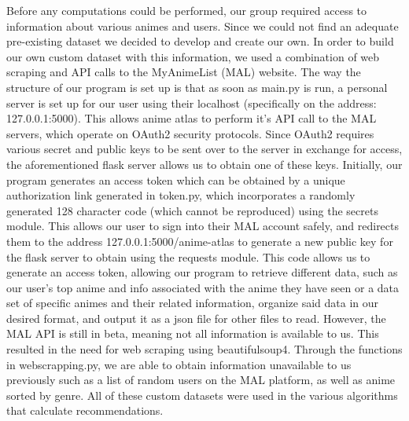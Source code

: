 \documentclass[fontsize=11pt]{article}
\begin{document}
\item[] Before any computations could be performed, our group required access to information about various animes and users. Since we could not find an adequate pre-existing dataset we decided to develop and create our own. In order to build our own custom dataset with this information, we used a combination of web scraping and API calls to the MyAnimeList (MAL) website. The way the structure of our program is set up is that as soon as main.py is run, a personal server is set up for our user using their localhost (specifically on the address: 127.0.0.1:5000). This allows anime atlas to perform it’s API call to the MAL servers, which operate on OAuth2 security protocols. Since OAuth2 requires various secret and public keys to be sent over to the server in exchange for access, the aforementioned flask server allows us to obtain one of these keys. Initially, our program generates an access token which can be obtained by a unique authorization link generated in token.py, which incorporates a randomly generated 128 character code (which cannot be reproduced) using the secrets module. This allows our user to sign into their MAL account safely, and redirects them to the address 127.0.0.1:5000/anime-atlas to generate a new public key for the flask server to obtain using the requests module. This code allows us to generate an access token, allowing our program to retrieve different data, such as our user’s top anime and info associated with the anime they have seen or a data set of specific animes and their related information, organize said data in our desired format, and output it as a json file for other files to read. However, the MAL API is still in beta, meaning not all information is available to us. This resulted in the need for web scraping using beautifulsoup4. Through the functions in webscrapping.py, we are able to obtain information unavailable to us previously such as a list of random users on the MAL platform, as well as anime sorted by genre. All of these custom datasets were used in the various algorithms that calculate recommendations. \\
\end{document}
